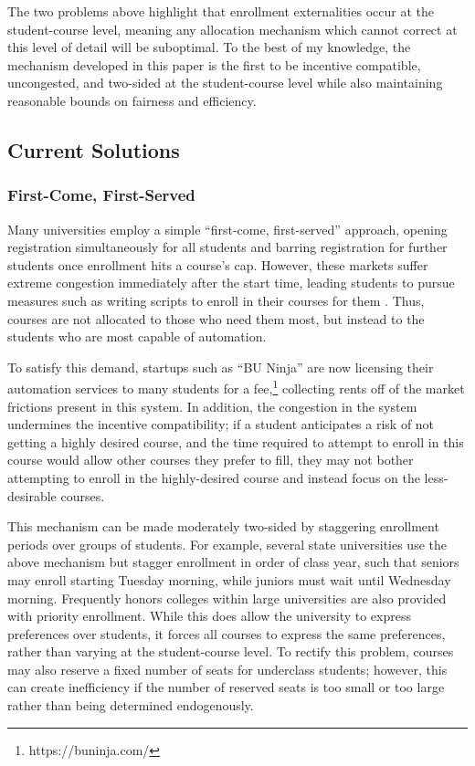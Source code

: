 \documentclass{article}
\begin{document}
The two problems above highlight that enrollment externalities occur at the student-course level, meaning any allocation mechanism which cannot correct at this level of detail will be suboptimal. To the best of my knowledge, the mechanism developed in this paper is the first to be incentive compatible, uncongested, and two-sided at the student-course level while also maintaining reasonable bounds on fairness and efficiency. 

\subsection{Current Solutions}
\label{current_solutions}

\subsubsection{First-Come, First-Served}

Many universities employ a simple ``first-come, first-served'' approach, opening registration simultaneously for all students and barring registration for further students once enrollment hits a course's cap. However, these markets suffer extreme congestion immediately after the start time, leading students to pursue measures such as writing scripts to enroll in their courses for them \parencite{mckenzie2019}. Thus, courses are not allocated to those who need them most, but instead to the students who are most capable of automation. 

To satisfy this demand, startups such as ``BU Ninja'' are now licensing their automation services to many students for a fee,\footnote{https://buninja.com/} collecting rents off of the market frictions present in this system. In addition, the congestion in the system undermines the incentive compatibility; if a student anticipates a risk of not getting a highly desired course, and the time required to attempt to enroll in this course would allow other courses they prefer to fill, they may not bother attempting to enroll in the highly-desired course and instead focus on the less-desirable courses. 

This mechanism can be made moderately two-sided by staggering enrollment periods over groups of students. For example, several state universities use the above mechanism but stagger enrollment in order of class year, such that seniors may enroll starting Tuesday morning, while juniors must wait until Wednesday morning. Frequently honors colleges within large universities are also provided with priority enrollment. While this does allow the university to express preferences over students, it forces all courses to express the same preferences, rather than varying at the student-course level. To rectify this problem, courses may also reserve a fixed number of seats for underclass students; however, this can create inefficiency if the number of reserved seats is too small or too large rather than being determined endogenously.
\end{document}
